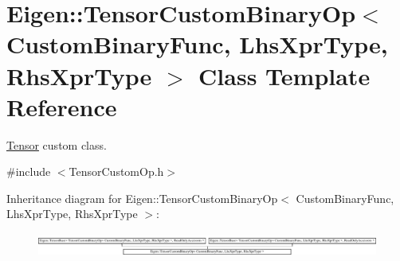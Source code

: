 \hypertarget{class_eigen_1_1_tensor_custom_binary_op}{}\section{Eigen\+:\+:Tensor\+Custom\+Binary\+Op$<$ Custom\+Binary\+Func, Lhs\+Xpr\+Type, Rhs\+Xpr\+Type $>$ Class Template Reference}
\label{class_eigen_1_1_tensor_custom_binary_op}


\hyperlink{class_eigen_1_1_tensor}{Tensor} custom class.  




{\ttfamily \#include $<$Tensor\+Custom\+Op.\+h$>$}

Inheritance diagram for Eigen\+:\+:Tensor\+Custom\+Binary\+Op$<$ Custom\+Binary\+Func, Lhs\+Xpr\+Type, Rhs\+Xpr\+Type $>$\+:\begin{figure}[H]
\begin{center}
\leavevmode
\includegraphics[height=0.804598cm]{class_eigen_1_1_tensor_custom_binary_op}
\end{center}
\end{figure}
